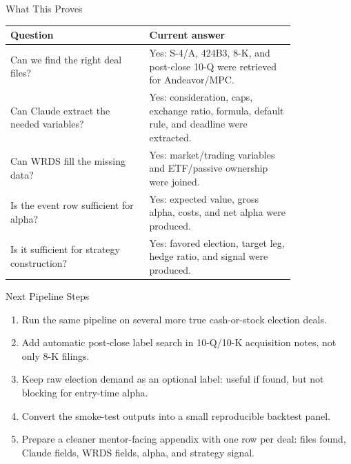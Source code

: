\documentclass[aspectratio=169,11pt]{beamer}
\begin{document}
\begin{frame}{What This Proves}
\small
\begin{tabular}{p{0.40\linewidth}p{0.42\linewidth}}
\toprule
\textbf{Question} & \textbf{Current answer} \\
\midrule
Can we find the right deal files? & Yes: S-4/A, 424B3, 8-K, and post-close 10-Q were retrieved for Andeavor/MPC. \\
Can Claude extract the needed variables? & Yes: consideration, caps, exchange ratio, formula, default rule, and deadline were extracted. \\
Can WRDS fill the missing data? & Yes: market/trading variables and ETF/passive ownership were joined. \\
Is the event row sufficient for alpha? & Yes: expected value, gross alpha, costs, and net alpha were produced. \\
Is it sufficient for strategy construction? & Yes: favored election, target leg, hedge ratio, and signal were produced. \\
\bottomrule
\end{tabular}
\end{frame}

\begin{frame}{Next Pipeline Steps}
\small
\begin{enumerate}
  \item Run the same pipeline on several more true cash-or-stock election deals.
  \item Add automatic post-close label search in 10-Q/10-K acquisition notes, not only 8-K filings.
  \item Keep raw election demand as an optional label: useful if found, but not blocking for entry-time alpha.
  \item Convert the smoke-test outputs into a small reproducible backtest panel.
  \item Prepare a cleaner mentor-facing appendix with one row per deal: files found, Claude fields, WRDS fields, alpha, and strategy signal.
\end{enumerate}
\end{frame}
\end{document}
